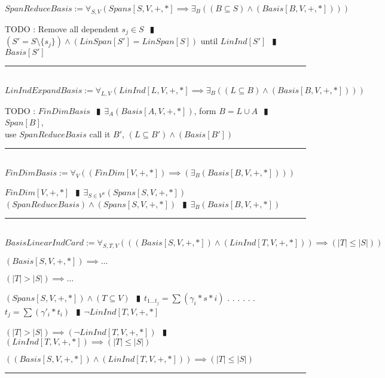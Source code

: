 \documentclass{book}
\newcommand{\abr}{:=}
\newcommand{\cont}{\phantom{.}. . .\phantom{.}}
\newcommand{\pipe}{$\phantom{(}\vrectangleblack\phantom{)}$}
\newcommand{\pr}[1]{\left(#1\right)}
\begin{document}
$SpanReduceBasis \abr \forall_{S, V}\pr{Spans[S, V, +, *] \implies \exists_{B}\pr{(B \subseteq S) \land (Basis[B, V, +, *])}}$
\begin{enumerate}
  \lit TODO : Remove all dependent $s_j \in S$ \pipe $(S' = S \setminus \{s_j\}) \land (LinSpan[S'] = LinSpan[S])$ until $LinInd[S']$ \pipe $Basis[S']$
\end{enumerate} \vspace{.75mm} \hrule \vspace{.75mm} \ \\ 

$LinIndExpandBasis \abr \forall_{L, V}\pr{LinInd[L, V, +, *] \implies \exists_{B}\pr{(L \subseteq B) \land (Basis[B, V, +, *])}}$
\begin{enumerate}
  \lit TODO : $FinDimBasis$ \pipe $\exists_{A}(Basis[A, V, +, *])$, form $B = L \cup A$ \pipe $Span[B]$, \\
      use $SpanReduceBasis$ call it $B'$, $(L \subseteq B') \land (Basis[B'])$
\end{enumerate} \vspace{.75mm} \hrule \vspace{.75mm} \ \\ 

$FinDimBasis \abr \forall_{V}\pr{(FinDim[V, +, *]) \implies \pr{\exists_{B}(Basis[B, V, +, *])}}$
\begin{enumerate}
  \lit $FinDim[V, +, *]$ \pipe $\exists_{S \in V^n}(Spans[S, V, +, *])$
  \lit $(SpanReduceBasis) \land (Spans[S, V, +, *])$ \pipe $\exists_{B}(Basis[B, V, +, *])$
\end{enumerate} \vspace{.75mm} \hrule \vspace{.75mm} \ \\ 

$BasisLinearIndCard \abr \forall_{S, T, V}\pr{\pr{(Basis[S, V, +, *]) \land (LinInd[T, V, +, *])} \implies (|T| \leq |S|)}$
\begin{enumerate}
  \lit $(Basis[S, V, +, *]) \implies \ldots$
  \begin{enumerate}
      \lit $(|T| > |S|) \implies \ldots$
      \begin{enumerate}
        \lit $(Spans[S, V, +, *]) \land (T \subseteq V)$ \pipe $t_{1 \ldots t_j} = \sum(\gamma_i * s*i)$ \cont
        \lit \cont $t_j = \sum(\gamma'_i * t_i)$ \pipe $\lnot LinInd[T, V, +, *]$
      \end{enumerate}
      \lit $(|T| > |S|) \implies (\lnot LinInd[T, V, +, *])$ \pipe $(LinInd[T, V, +, *]) \implies (|T| \leq |S|)$
   \end{enumerate}
  \lit $\pr{(Basis[S, V, +, *]) \land (LinInd[T, V, +, *])} \implies (|T| \leq |S|)$
\end{enumerate} \vspace{.75mm} \hrule \vspace{.75mm} \ \\ 
\end{document}
